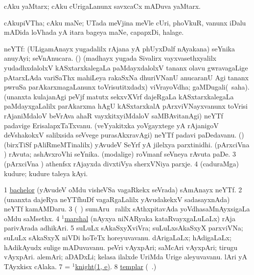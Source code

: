 \bentry
{}
\gl{\nA}
\bmng
cAku yaMtarx; cAku cUrigaLanunx savxcaCx mADuva yaMtarx. 
\emng
\eentry

\bentry
{}
\gl{\nA}
\bmng
cAkupiVTha; cAku maNe; UTada meVjina meVle cUri, phoVkuR, \mo vanunx iDalu mADida loVhada yA itara bageya maNe, capapxDi, halage. 
\emng
\eentry

\bentry
{}
\gl{\nA}
\bmng
\bnum
{} neYTf: 
\banum
{} (ULigamAnayx yugadalilx rAjana yA phUyxDalf nAyakana) seYnika anuyAyi; seVnAnucara. 
 (\ca) (madhayx yugada Sivalirx vayxvasethxyalilx yudadhxdalolxV kASxtarxkalegaLa paMdayxdalolxV tananx olavu gwravagaLige pAtarxLAda variSaThx mahiLeya rakaSxNa dhuriVNanU anucaranU Agi tananx pwruSa parAkarxmagaLanunx toVrisutitxdadx) viVrayoVdha; gaMDugali(\rUpa\ saha). 
 (unanxta kulajanAgi peVjf matutx sekxvXVrf dajeRgaLa kASxtarxkalegaLa paMdayxgaLalilx parAkarxma hAgU kASxtarxkalA pArxviVNayxvanunx toVrisi rAjaniMdaloV beVrAva ahaR vayxkitxyiMdaloV saMBAvitanAgi) neYTf padavige ErisalapxTaTxvanu. 
 (veYyakitxka yoVgayxtege yA rAjanigoV deVshakokxV salilxsida seVvege purasAkxravAgi) neYTf padavi paDedavanu. 
\hypertarget{knight(1)1e}{} 
 (\ca) (birxTiSf pAliRmeMTinalilx) yAvudeV SeYrf yA jilelxya parxtinidhi. 
\eanum
\numie
{} (pArxciVna \roVca) 
\banum
{} rAvuta; ashAvxroVhi seYnika. 
 (modalige) roVmanf seVneya rAvuta paDe. 
\eanum
\numie
\num{3} (pArxciVna \girxVca) athenfsx rAjayxda divxtiVya sherxVNiya parxje. 
\num{4} (caduraMga) kudure; kudure taleya kAyi.  
\enum
\emng

\noindent
\gl{\pagu}
\bmng
\bnum
\num{1}  \hyperref{kandict_b.pdf}{B}{bachelor pagu}{bachelor} (yAvudeV oMdu visheVSa vagaRkekx seVrada) sAmAnayx neYTf. 
\num{2}  (unanxta dajeRya neYTfhuDf vagaRgaLalilx yAvudakekxV sadasayxnAda) neYTf kamAMDaru. 
\num{3}  (\bava\ ) sumAru \kirxsha\ ralilx sAthxpitavAda yoVdhasaMnAyxsigaLa oMdu saMsethx. 
\num{4}  \hyperref{kandict_m.pdf}{M}{marshal(1) pagu(2)}{$^1$marshal} (nAyxya niNARyaka kataRvayxgaLuLaLx) rAja parivArada adhikAri. 
\num{5}  suLuLx sAkaSxyXviVra; suLuLxsAkaSxyX parxviVNa; suLuLx sAkaSxyX niVDi hoTeTx horeyuvavanu. 
  
\banum
{} dArigaLaLx; hAdigaLaLx; hAdikAyudx sulige mADuvavanu. 
 peVri vAyxpAri; saMcAri vAyxpAri; tirugu vAyxpAri. 
 alemAri; aDADxLi; kelasa ilalxde UriMda Urige aleyuvavanu. 
 lAri yA TAyxkisx cAlaka. 
\eanum
\numie
\num{7}  = \hyperlink{knight(1)1e}{$^1$knight(1, e)}. 
\num{8}  \hyperref{kandict_t.pdf}{T}{templar pagu}{templar} (\bava\ .) 
\enum
\emng
\eentry

